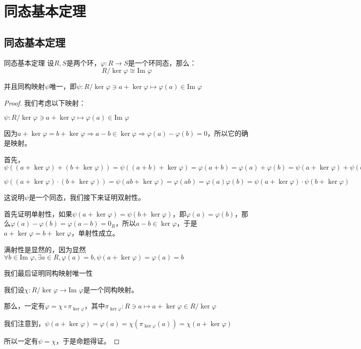 \documentclass[12pt, a4paper, oneside, UTF8]{ctexbook}
\begin{document}
	\section{同态基本定理}
		\subsection{同态基本定理}
			\begin{them}{同态基本定理}{}
				设$R,S$是两个环，$\varphi : R \rightarrow S$是一个环同态，那么：
				\begin{equation}
					R / \ker \varphi \cong \text{Im }\varphi 
				\end{equation}

				并且同构映射$\psi $唯一，即$\psi : R / \ker \varphi \ni a+\ker \varphi  \mapsto \varphi (a) \in \text{Im }\varphi $
			\end{them}
			\begin{proof}
				我们考虑以下映射：

				$\psi : R / \ker \varphi \ni a+\ker \varphi  \mapsto \varphi (a) \in \text{Im }\varphi $

				因为$a+\ker \varphi =b+\ker \varphi \Rightarrow a-b \in \ker \varphi \Rightarrow \varphi (a)-\varphi (b)=0$，所以它的确是映射。

				首先，$\psi \left((a+\ker \varphi )+(b+\ker \varphi )\right)=\psi \left((a+b)+\ker \varphi \right)=\varphi (a+b)=\varphi (a)+\varphi (b)=\psi (a+\ker \varphi )+\psi (b+\ker \varphi )$
				
				$\psi \left((a+\ker \varphi )\cdot (b+\ker \varphi )\right)=\psi (ab+\ker \varphi )=\varphi (ab)=\varphi (a)\varphi (b)=\psi (a+\ker \varphi )\cdot \psi (b+\ker \varphi )$

				这说明$\psi $是一个同态，我们接下来证明双射性。

				首先证明单射性，如果$\psi (a+\ker \varphi )=\psi (b+\ker \varphi )$，即$\varphi (a)=\varphi (b)$，那么$\varphi (a)-\varphi (b)=\varphi (a-b)=0_R$，所以$a-b \in \ker \varphi $，于是$a+\ker \varphi =b+\ker \varphi $，单射性成立。

				满射性是显然的，因为显然$\forall b \in \text{Im }\varphi ,\exists a \in R,\varphi (a)=b,\psi (a+\ker \varphi )=\varphi (a)=b$

				我们最后证明同构映射唯一性

				我们设$\chi  : R / \ker \varphi \rightarrow \text{Im }\varphi $是一个同构映射。

				那么，一定有$\varphi =\chi \circ \pi_{\ker \varphi }$，其中$\pi_{\ker \varphi } : R \ni a \mapsto  a+\ker \varphi \in R/\ker \varphi $

				我们注意到，$\psi(a+\ker \varphi )=\varphi (a)=\chi \left(\pi_{\ker \varphi }(a)\right)=\chi(a+\ker \varphi )$
				
				所以一定有$\psi =\chi $，于是命题得证。
			\end{proof}
\end{document}
